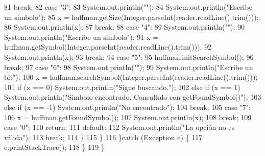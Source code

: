 \begin{DoxyCode}
81                 \textcolor{keywordflow}{break};
82                 \textcolor{keywordflow}{case} \textcolor{stringliteral}{"3"}:
83                     System.out.println(\textcolor{stringliteral}{""});
84                     System.out.println(\textcolor{stringliteral}{"Escribe un simbolo"});
85                     x = huffman.getSize(Integer.parseInt(reader.readLine().trim()));
86                     System.out.println(x);
87                 \textcolor{keywordflow}{break};
88                 \textcolor{keywordflow}{case} \textcolor{stringliteral}{"4"}:
89                     System.out.println(\textcolor{stringliteral}{""});
90                     System.out.println(\textcolor{stringliteral}{"Escribe un simbolo"});
91                     x = huffman.getSymbol(Integer.parseInt(reader.readLine().trim()));
92                     System.out.println(x);
93                 \textcolor{keywordflow}{break};
94                 \textcolor{keywordflow}{case} \textcolor{stringliteral}{"5"}:
95                     huffman.initSearchSymbol();
96                 \textcolor{keywordflow}{break};
97                 \textcolor{keywordflow}{case} \textcolor{stringliteral}{"6"}:
98                     System.out.println(\textcolor{stringliteral}{""});
99                     System.out.println(\textcolor{stringliteral}{"Escribe un bit"});
100                     x = huffman.searchSymbol(Integer.parseInt(reader.readLine().trim()));
101                     \textcolor{keywordflow}{if} (x == 0) System.out.println(\textcolor{stringliteral}{"Sigue buscando."});
102                     \textcolor{keywordflow}{else} \textcolor{keywordflow}{if} (x == 1) System.out.println(\textcolor{stringliteral}{"Simbolo encontrado. Consultalo con
       getFoundSymbol()"});
103                     \textcolor{keywordflow}{else} \textcolor{keywordflow}{if} (x == -1) System.out.println(\textcolor{stringliteral}{"No encontrado"});
104                 \textcolor{keywordflow}{break};
105                 \textcolor{keywordflow}{case} \textcolor{stringliteral}{"7"}:
106                     x = huffman.getFoundSymbol();
107                     System.out.println(x);
108                 \textcolor{keywordflow}{break};
109                 \textcolor{keywordflow}{case} \textcolor{stringliteral}{"0"}:
110                     \textcolor{keywordflow}{return};
111                 \textcolor{keywordflow}{default}:
112                     System.out.println(\textcolor{stringliteral}{"La opción no es válida"});
113                 \textcolor{keywordflow}{break};
114             \}
115         \}
116     \}\textcolor{keywordflow}{catch} (Exception e) \{
117         e.printStackTrace();
118     \}
119     \}
\end{DoxyCode}
\mbox{\label{classdomini_1_1algorithm_1_1Driver____Huffman_a0504e4a97aa7c7a0ad7c1a75187adb10}} 
